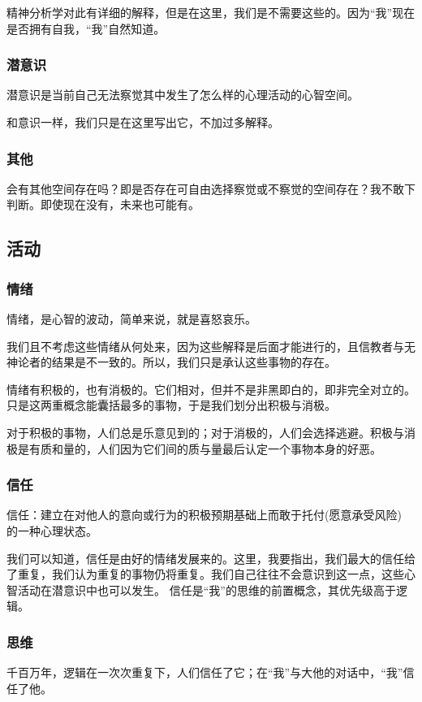 \documentclass[fontset=windows, 12pt, a4paper]{article}
\begin{document}
精神分析学对此有详细的解释，但是在这里，我们是不需要这些的。因为“我”现在是否拥有自我，“我”自然知道。

\subsubsection{潜意识}
潜意识是当前自己无法察觉其中发生了怎么样的心理活动的心智空间。

和意识一样，我们只是在这里写出它，不加过多解释。

\subsubsection{其他}
会有其他空间存在吗？即是否存在可自由选择察觉或不察觉的空间存在？我不敢下判断。即使现在没有，未来也可能有。

\subsection{活动}

\subsubsection{情绪}
情绪，是心智的波动，简单来说，就是喜怒哀乐。

我们且不考虑这些情绪从何处来，因为这些解释是后面才能进行的，且信教者与无神论者的结果是不一致的。所以，我们只是承认这些事物的存在。

情绪有积极的，也有消极的。它们相对，但并不是非黑即白的，即非完全对立的。只是这两重概念能囊括最多的事物，于是我们划分出积极与消极。

对于积极的事物，人们总是乐意见到的；对于消极的，人们会选择逃避。积极与消极是有质和量的，人们因为它们间的质与量最后认定一个事物本身的好恶。

\subsubsection{信任}
信任：建立在对他人的意向或行为的积极预期基础上而敢于托付(愿意承受风险) 的一种心理状态。\cite{ref1}

我们可以知道，信任是由好的情绪发展来的。这里，我要指出，我们最大的信任给了重复，我们认为重复的事物仍将重复。我们自己往往不会意识到这一点，这些心智活动在潜意识中也可以发生。
信任是“我”的思维的前置概念，其优先级高于逻辑。



\subsubsection{思维}
千百万年，逻辑在一次次重复下，人们信任了它；在“我”与大他的对话中，“我”信任了他。
\end{document}
